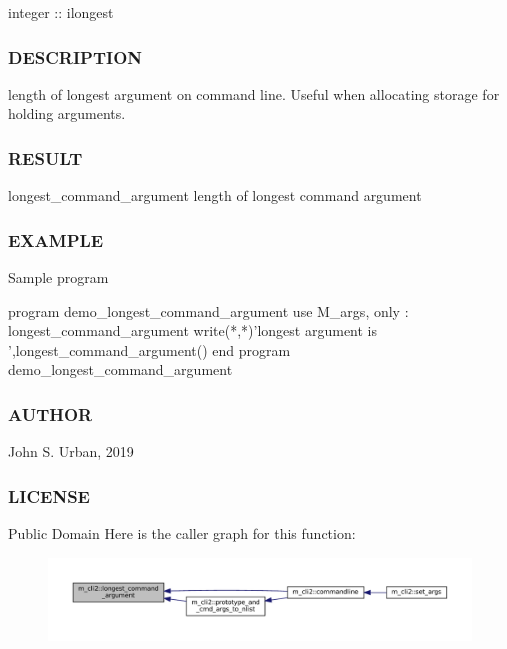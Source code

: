 integer \+:\+: ilongest

\subsubsection*{D\+E\+S\+C\+R\+I\+P\+T\+I\+ON}

length of longest argument on command line. Useful when allocating storage for holding arguments. \subsubsection*{R\+E\+S\+U\+LT}

longest\+\_\+command\+\_\+argument length of longest command argument \subsubsection*{E\+X\+A\+M\+P\+LE}

Sample program \begin{DoxyVerb} program demo_longest_command_argument
 use M_args, only : longest_command_argument
    write(*,*)'longest argument is ',longest_command_argument()
 end program demo_longest_command_argument
\end{DoxyVerb}
 \subsubsection*{A\+U\+T\+H\+OR}

John S. Urban, 2019 \subsubsection*{L\+I\+C\+E\+N\+SE}

Public Domain Here is the caller graph for this function\+:\nopagebreak
\begin{figure}[H]
\begin{center}
\leavevmode
\includegraphics[width=350pt]{namespacem__cli2_a7240f12031027172b87fde623bd77958_icgraph}
\end{center}
\end{figure}
\mbox{\label{namespacem__cli2_a6d2d93ab8471667e632bf7a0e95ebd13}} 
